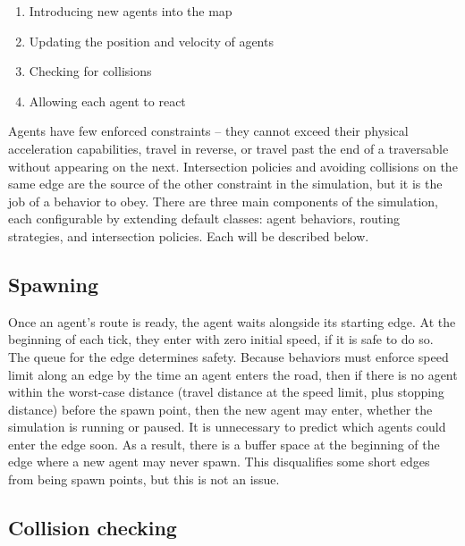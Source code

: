 \documentclass[letterpaper, 10 pt, conference]{ieeeconf}  %
\begin{document}
{\begin{enumerate}
  \item Introducing new agents into the map
  \item Updating the position and velocity of agents
  \item Checking for collisions
  \item Allowing each agent to react
\end{enumerate}

Agents have few enforced constraints -- they cannot exceed their physical
acceleration capabilities, travel in reverse, or travel past the end of a
traversable without appearing on the next. Intersection policies and avoiding
collisions on the same edge are the source of the other constraint in the
simulation, but it is the job of a behavior to obey. There are three main
components of the simulation, each configurable by extending default classes:
agent behaviors, routing strategies, and intersection policies. Each will be
described below.


\subsection{Spawning}


Once an agent's route is ready, the agent waits alongside its starting edge. At
the beginning of each tick, they enter with zero initial speed, if it is safe to
do so. The queue for the edge determines safety. Because behaviors must enforce
speed limit along an edge by the time an agent enters the road, then if there is
no agent within the worst-case distance (travel distance at the speed limit,
plus stopping distance) before the spawn point, then the new agent may enter,
whether the simulation is running or paused. It is unnecessary to predict which
agents could enter the edge soon. As a result, there is a buffer space at the
beginning of the edge where a new agent may never spawn. This disqualifies some
short edges from being spawn points, but this is not an issue.

\subsection{Collision checking}

}
\end{document}

